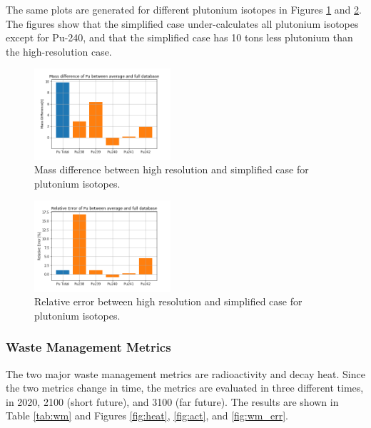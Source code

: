 \documentclass{anstrans}
\begin{document}
The same plots are generated for different plutonium
isotopes in Figures \ref{fig:pu_mass} and \ref{fig:pu_rel}.
The figures show that the simplified case under-calculates
all plutonium isotopes except for Pu-240, and that the
simplified case has 10 tons less plutonium than the
high-resolution case.

\begin{figure}
    \centering
    \includegraphics[width=0.45\textwidth]{./images/pu_mass.png}
    \caption{Mass difference between high resolution and simplified case for plutonium isotopes.}
    \label{fig:pu_mass}
\end{figure}

\begin{figure}
    \centering
    \includegraphics[width=0.45\textwidth]{./images/pu_rel.png}
    \caption{Relative error between high resolution and simplified case for plutonium isotopes.}
    \label{fig:pu_rel}
\end{figure}

\subsubsection{Waste Management Metrics}
The two major waste management metrics are radioactivity and
decay heat. Since the two metrics change in time, the metrics
are evaluated in three different times, in 2020, 2100 (short future),
and 3100 (far future). The results are shown in Table \ref{tab:wm} and
Figures \ref{fig:heat}, \ref{fig:act}, and \ref{fig:wm_err}.
\end{document}
